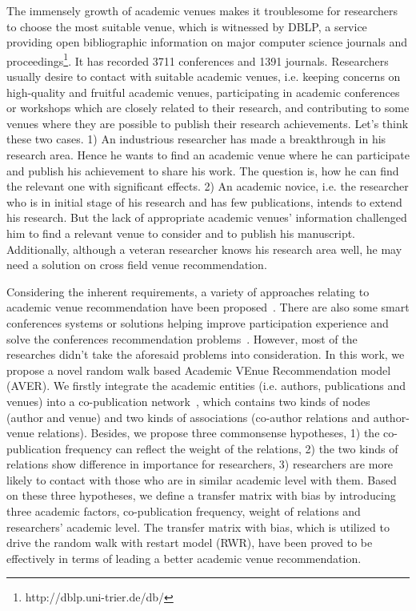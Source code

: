 \documentclass[9pt]{acm_proc_article-sp}
\begin{document}
The immensely growth of academic venues makes it troublesome for researchers to choose the most suitable venue, which is witnessed by DBLP, a service providing open bibliographic information on major computer science journals and proceedings\footnote{http://dblp.uni-trier.de/db/}. It has recorded 3711 conferences and 1391 journals. Researchers usually desire to contact with suitable academic venues, i.e. keeping concerns on high-quality and fruitful academic venues, participating in academic conferences or workshops which are closely related to their research, and contributing to some venues where they are possible to publish their research achievements. Let's think these two cases. 1) An industrious researcher has made a breakthrough in his research area. Hence he wants to find an academic venue where he can participate and publish his achievement to share his work. The question is, how he can find the relevant one with significant effects. 2) An academic novice, i.e. the researcher who is in initial stage of his research and has few publications, intends to extend his research. But the lack of appropriate academic venues' information challenged him to find a relevant venue to consider and to publish his manuscript. Additionally, although a veteran researcher knows his research area well, he may need a solution on cross field venue recommendation.

Considering the inherent requirements, a variety of approaches relating to academic venue recommendation have been proposed~\cite{pham2011clustering,yang2012venue,luong2012publication,chen2012social,asabere2014improving}. There are also some smart conferences systems or solutions helping improve participation experience and solve the conferences recommendation problems~\cite{wongchokprasitti2010conference}. However, most of the researches didn't take the aforesaid problems into consideration. In this work, we propose a novel random walk based Academic VEnue Recommendation model (AVER). We firstly integrate the academic entities (i.e. authors, publications and venues) into a co-publication network~\cite{lemarchand2012long}, which contains two kinds of nodes (author and venue) and two kinds of associations (co-author relations and author-venue relations). Besides, we propose three commonsense  hypotheses, 1) the co-publication frequency can reflect the weight of the relations, 2) the two kinds of relations show difference in importance for researchers, 3) researchers are more likely to contact with those who are in similar academic level with them. Based on these three hypotheses, we define a transfer matrix with bias by introducing three academic factors, co-publication frequency, weight of relations and researchers' academic level. The transfer matrix with bias, which is utilized to drive the random walk with restart model (RWR), have been proved to be effectively in terms of leading a better academic venue recommendation.
\end{document}

